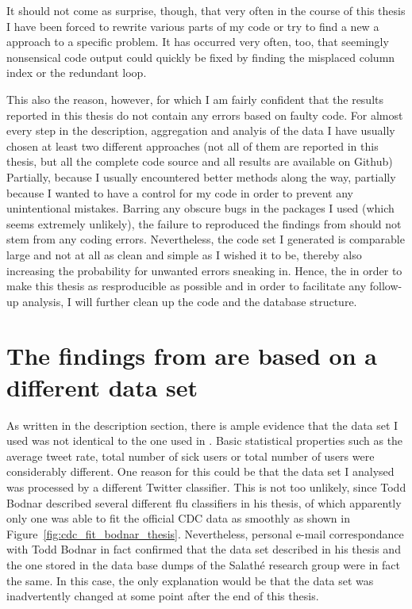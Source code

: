 \documentclass[11pt, a4paper]{report}\usepackage[]{graphicx}\usepackage[]{color}
\begin{document}
It should not come as surprise, though, that very often in the course of this thesis I have been forced to rewrite various parts of my code or try to find a new a approach to a specific problem. It has occurred very often, too, that seemingly nonsensical code output could quickly be fixed by finding the misplaced column index or the redundant loop.\newline

This also the reason, however, for which I am fairly confident that the results reported in this thesis do not contain any errors based on faulty code. For almost every step in the description, aggregation and analyis of the data I have usually chosen at least two different approaches (not all of them are reported in this thesis, but all the complete code source and all results are available on Github) Partially, because I usually encountered better methods along the way, partially because I wanted to have a control for my code in order to prevent any unintentional mistakes. Barring any obscure bugs in the packages I used (which seems extremely unlikely), the failure to reproduced the findings from \citep{bodnar_data_2015} should not stem from any coding errors. Nevertheless, the code set I generated is comparable large and not at all as clean and simple as I wished it to be, thereby also increasing the probability for unwanted errors sneaking in. Hence, the in order to make this thesis as resproducible as possible and in order to facilitate any follow-up analysis, I will further clean up the code and the database structure.\newline

\section{The findings from \citep{bodnar_data_2015} are based on a different data set}
As written in the description section, there is ample evidence that the data set I used was not identical to the one used in \citep{bodnar_data_2015}. Basic statistical properties such as the average tweet rate, total number of sick users or total number of users were considerably different. One reason for this could be that the data set I analysed was processed by a different Twitter classifier. This is not too unlikely, since Todd Bodnar described several different flu classifiers in his thesis, of which apparently only one was able to fit the official CDC data as smoothly as shown in Figure~\ref{fig:cdc_fit_bodnar_thesis}. Nevertheless, personal e-mail correspondance with Todd Bodnar in fact confirmed that the data set described in his thesis and the one stored in the data base dumps of the Salathé research group were in fact the same. In this case, the only explanation would be that the data set was inadvertently changed at some point after the end of this thesis.\newline
\end{document}
